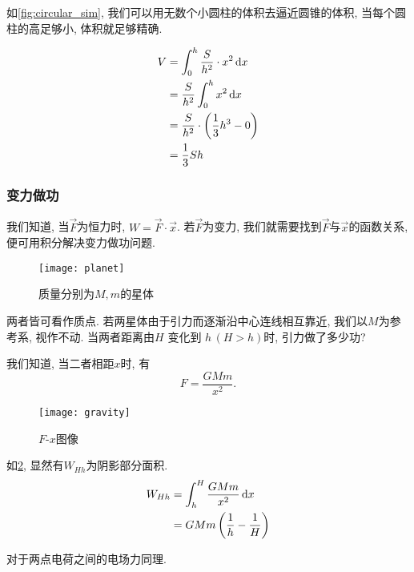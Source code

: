 如\cref{fig:circular_sim}, 我们可以用无数个小圆柱的体积去逼近圆锥的体积, 当每个圆柱的高足够小, 体积就足够精确.

\begin{align*}
  V & = \int _0^{h} \frac{S}{h^{2} }\cdot x^{2} \mathop{}\!\mathrm{d} x         \\
  & = \frac{S}{h^{2} }\int _0^{h} x^{2}\mathop{}\!\mathrm{d} x                \\
  & = \frac{S}{h^{2}} \cdot \left(\frac{1}{3} h^3 -0 \right) \\
  & = \frac{1}{3} Sh
\end{align*}

\subsubsection{变力做功}
我们知道, 当$\vec{F} $为恒力时, $W = \vec{F} \cdot \vec{x} $.
若$\vec{F} $为变力, 我们就需要找到$\vec{F} $与$\vec{x} $的函数关系, 便可用积分解决变力做功问题.

\begin{figure}
  \begin{center}
    \texttt{[image: planet]}
  \end{center}
  \caption{质量分别为$M,m$的星体}\label{fig:planet}
\end{figure}

\begin{example}
  两者皆可看作质点.
  若两星体由于引力而逐渐沿中心连线相互靠近,
  我们以$M$为参考系, 视作不动.
  当两者距离由$H$ 变化到 $h \, (H>h)$时, 引力做了多少功?

  我们知道, 当二者相距$x$时, 有
  \[
    F = \frac{GMm}{x^2}
  .\]

  \begin{figure}[!ht]
    \begin{center}
      \texttt{[image: gravity]}
    \end{center}
    \caption{$F$-$x$图像}\label{fig:Fx}
  \end{figure}

  如\cref{fig:Fx}, 显然有$W_{Hh}$为阴影部分面积.
  \begin{align*}
    W_{Hh} & = \int _{h} ^{H} \frac{GMm}{x^2} \mathop{}\!\mathrm{d} x    \\
    & = GMm \left(\frac{1}{h}-\frac{1}{H}\right)
  \end{align*}

  对于两点电荷之间的电场力同理.

\end{example}
